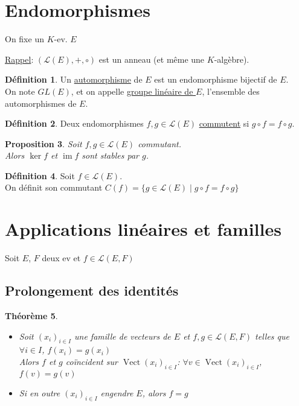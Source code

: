 \documentclass[10pt,a4paper]{article}
\theoremstyle{plain}
\newtheorem{proposition}{Proposition}[section]
\newtheorem{theorem}[proposition]{Théorème}
\theoremstyle{definition}
\newtheorem{definition}[proposition]{Définition}
\DeclareMathOperator{\vect}{Vect}
\DeclareMathOperator{\im}{im}
\begin{document}
\section{Endomorphismes}
On fixe un $K$-ev. $E$ \medskip

\uline{Rappel}: $(\mathcal{L}(E), +, \circ)$ est un anneau (et même une $K$-algèbre).
\begin{definition}
Un \uline{automorphisme} de $E$ est un endomorphisme bijectif de $E$. \\
On note $GL(E)$, et on appelle \uline{groupe linéaire de $E$}, l'ensemble des automorphismes de $E$.
\end{definition}
\begin{definition}
Deux endomorphismes $f, g \in \mathcal{L}(E)$ \uline{commutent} si $g \circ f = f \circ g$.
\end{definition}
\begin{proposition}
Soit $f, g \in \mathcal{L}(E)$ commutant. \\
Alors $\ker f$ et $\im f$ sont stables par $g$.
\end{proposition}
\begin{definition}
Soit $f \in \mathcal{L}(E)$. \\
On définit son commutant $C(f) = \{ g \in \mathcal{L}(E) \mid g \circ f = f \circ g \}$
\end{definition}

\section{Applications linéaires et familles}
Soit $E$, $F$ deux ev et $f \in \mathcal{L}(E, F)$
\subsection{Prolongement des identités}
\begin{theorem}
\hfill
\begin{itemize}
\item Soit $(x_i)_{i \in I}$ une famille de vecteurs de $E$ et $f,g \in \mathcal{L}(E, F)$ telles que $\forall i \in I$, $f(x_i) = g(x_i)$ \\
Alors $f$ et $g$ coïncident sur $\vect(x_i)_{i \in I}$: $\forall v \in \vect(x_i)_{i \in I}$, $f(v) = g(v)$
\item Si en outre $(x_i)_{i \in I}$ engendre $E$, alors $f = g$
\end{itemize}
\end{theorem}
\end{document}
